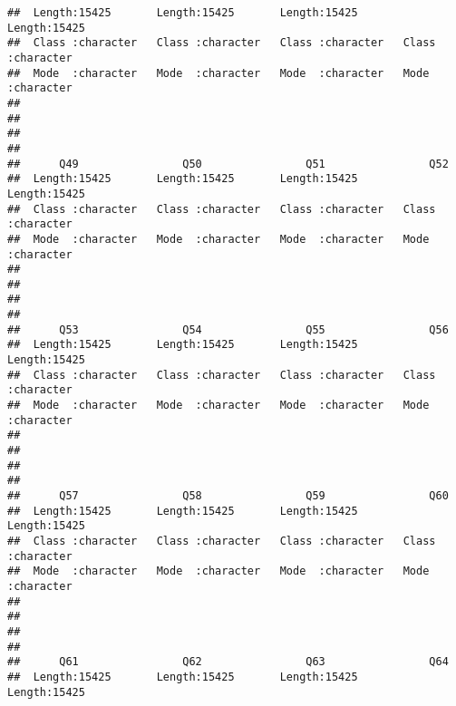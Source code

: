 \documentclass[
]{article}
\begin{document}
\begin{verbatim}
##  Length:15425       Length:15425       Length:15425       Length:15425      
##  Class :character   Class :character   Class :character   Class :character  
##  Mode  :character   Mode  :character   Mode  :character   Mode  :character  
##                                                                             
##                                                                             
##                                                                             
##                                                                             
##      Q49                Q50                Q51                Q52           
##  Length:15425       Length:15425       Length:15425       Length:15425      
##  Class :character   Class :character   Class :character   Class :character  
##  Mode  :character   Mode  :character   Mode  :character   Mode  :character  
##                                                                             
##                                                                             
##                                                                             
##                                                                             
##      Q53                Q54                Q55                Q56           
##  Length:15425       Length:15425       Length:15425       Length:15425      
##  Class :character   Class :character   Class :character   Class :character  
##  Mode  :character   Mode  :character   Mode  :character   Mode  :character  
##                                                                             
##                                                                             
##                                                                             
##                                                                             
##      Q57                Q58                Q59                Q60           
##  Length:15425       Length:15425       Length:15425       Length:15425      
##  Class :character   Class :character   Class :character   Class :character  
##  Mode  :character   Mode  :character   Mode  :character   Mode  :character  
##                                                                             
##                                                                             
##                                                                             
##                                                                             
##      Q61                Q62                Q63                Q64           
##  Length:15425       Length:15425       Length:15425       Length:15425      

\end{verbatim}
\end{document}
